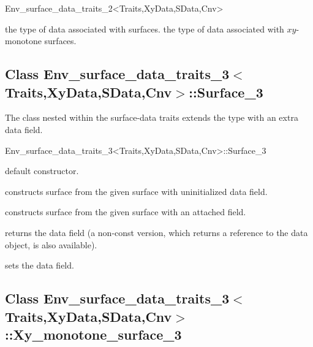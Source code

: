 \begin{ccRefClass}{Env_surface_data_traits_2<Traits,XyData,SData,Cnv>}

    {the type of data associated with surfaces.}
\ccGlue
{}
    {the type of data associated with $xy$-monotone surfaces.}

\ccInheritsFrom

\subsection*{Class Env\_surface\_data\_traits\_3$<$Traits,XyData,SData,Cnv$>$::Surface\_3}

The  class nested within the surface-data traits
extends the  type with an extra data field.

\begin{ccClass}{Env_surface_data_traits_3<Traits,XyData,SData,Cnv>::Surface_3}

\ccInheritsFrom

\ccCreation
{}

    {default constructor.}

    {constructs surface from the given  surface with uninitialized
     data field.}

    {constructs surface from the given  surface with an attached
      field.}

\ccAccessFunctions

  {returns the data field (a non-const version, which returns a reference
   to the data object, is also available).}

  {sets the data field.}

\end{ccClass}

\subsection*{Class Env\_surface\_data\_traits\_3$<$Traits,XyData,SData,Cnv$>$::Xy\_monotone\_surface\_3}


\end{ccRefClass}
